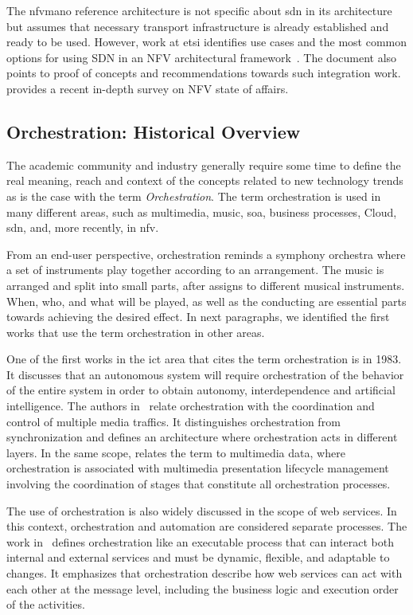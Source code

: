 The \gls{nfvmano} reference architecture is not  specific about \gls{sdn} in its architecture but  assumes that necessary transport infrastructure is already established and ready to be used. However, work at \gls{etsi} identifies use cases and the most common options for using SDN in an NFV architectural framework~\cite{ETSINetworkFramework}. The document also points to  proof of concepts and recommendations towards such integration work.
\cite{nfv-survey18} provides a recent in-depth survey on NFV state of affairs. 

\subsection{Orchestration: Historical Overview}
The academic community and industry generally require some time to define the real meaning, reach and context of the concepts related to new technology trends as is the case with the term \textit{Orchestration}. 
The term orchestration is used in many different areas, such as multimedia, music, \gls{soa}, business processes, Cloud, \gls{sdn}, and, more recently, in \gls{nfv}.

From an end-user perspective, orchestration reminds a symphony orchestra where a set of instruments play together according to an arrangement. The music is arranged and split into small parts, after assigns to different musical instruments. When, who, and what will be played, as well as the conducting are essential parts towards achieving the desired effect. In next paragraphs, we identified the first works that use the term orchestration in other areas. 

One of the first works in the \gls{ict} area that cites the term orchestration is \cite{Anderson1983} in 1983. It discusses that an autonomous system will require orchestration of the behavior of the entire system in order to obtain autonomy, interdependence and artificial intelligence. The authors in~\cite{Campbell1992} relate orchestration with the coordination and control of multiple media traffics. It distinguishes orchestration from synchronization and defines an architecture where orchestration acts in different layers. In the same scope, \cite{Robbins1997ImplementationArchitecture} relates the term to multimedia data, where orchestration is associated with multimedia presentation lifecycle management involving the coordination of stages that constitute all orchestration processes. 

The use of orchestration is also widely discussed in the scope of web services. In this context, orchestration and automation are considered separate processes. The work in~\cite{Peltz2003WebChoreography} defines orchestration like an executable process that can interact both internal and external services and must be dynamic, flexible, and adaptable to changes. It emphasizes that orchestration describe how web services can act with each other at the message level, including the business logic and execution order of the activities. 

